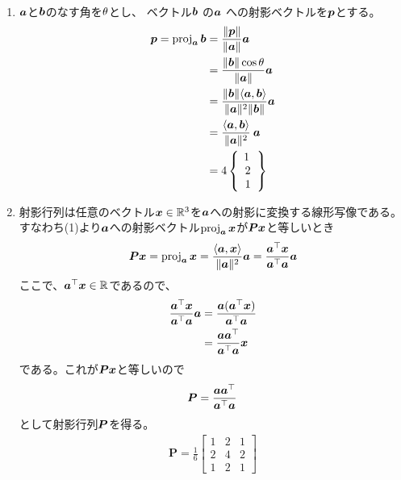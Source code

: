 \begin{ans*}
  ${}$
  \begin{enumerate}[label=(\arabic*)]
    \item ${\bm{a}}$と${\bm{b}}$のなす角を${\theta}$とし、
    ベクトル${\bm{b}}$ の${\bm{a}}$ への射影ベクトルを${\bm{p}}$とする。
    \begin{align}
      \bm{p}=\operatorname{proj}_{{\bm{a}}} {\bm{b}}
      &= \frac{\|{\bm{p}}\|}{\|{\bm{a}}\|}{\bm{a}} \\
      &= \frac{\|{\bm{b}}\|\cos{\theta}}{\|{\bm{a}}\|}{\bm{a}} \\
      &= \frac{\|{\bm{b}}\|\langle{\bm{a}},{\bm{b}}\rangle}{\|{\bm{a}}\|^2\|{\bm{b}}\|}{\bm{a}} \\
      &= \frac{\langle{\bm{a}},{\bm{b}}\rangle}{\|{\bm{a}}\|^2}\:{\bm{a}} \\
      &=
      4
      \begin{Bmatrix}
      \:\:  1 \:\:\:\\ 2 \\ 1 \\
      \end{Bmatrix}
    \end{align}
    \item
    射影行列は任意のベクトル${\bm{x}}\in\mathbb{R}^3$を${\bm{a}}$への射影に変換する線形写像である。
    すなわち(1)より${\bm{a}}$への射影ベクトル$\operatorname{proj}_{{\bm{a}}}{\bm{x}}$が$\bm{P}{\bm{x}}$と等しいとき
    \begin{gather}
      \bm{P}{\bm{x}} = \operatorname{proj}_{{\bm{a}}}{\bm{x}} = \frac{\langle{\bm{a}},{\bm{x}}\rangle}{\|{\bm{a}}\|^2} {\bm{a}} = \frac{{\bm{a}}^\top {\bm{x}}}{{\bm{a}}^{\top}{\bm{a}}}{\bm{a}}
    \end{gather}
    ここで、${\bm{a}}^{\top}{\bm{x}} \in \mathbb{R}$であるので、
    \begin{align}
      \frac{{\bm{a}}^\top {\bm{x}}}{{\bm{a}}^{\top}{\bm{a}}}{\bm{a}}
      &= \frac{{\bm{a}} ({\bm{a}}^{\top} {\bm{x}})}{{\bm{a}}^{\top}{\bm{a}}} \\
      &= \frac{{\bm{a}}{\bm{a}}^{\top}}{{\bm{a}}^{\top}{\bm{a}}}{\bm{x}}
    \end{align}
    である。これが$\bm{P}{\bm{x}}$と等しいので
    \begin{gather}
      \bm{P} = \frac{{\bm{a}}{\bm{a}}^{\top}}{{\bm{a}}^{\top}{\bm{a}}}
    \end{gather}
    として射影行列$\bm{P}$を得る。
    \begin{align}
      \bm{P}
      = \frac{1}{6}
      \begin{bmatrix}
        1 & 2 & 1 \\ 2 & 4 & 2 \\ 1 & 2 & 1
      \end{bmatrix}
    \end{align}
  \end{enumerate}
\end{ans*}

